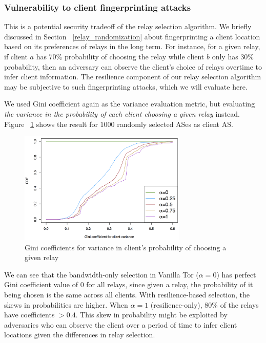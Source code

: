 \subsubsection{Vulnerability to client fingerprinting attacks}
This is a potential security tradeoff of the relay selection algorithm. We briefly discussed in Section ~\ref{relay_randomization} about fingerprinting a client location based on its preferences of relays in the long term. For instance, for a given relay, if client $a$ has 70\% probability of choosing the relay while client $b$ only has 30\% probability, then an adversary can observe the client's choice of relays overtime to infer client information. The resilience component of our relay selection algorithm may be subjective to such fingerprinting attacks, which we will evaluate here. 

We used Gini coefficient again as the variance evaluation metric, but evaluating \emph{the variance in the probability of each client choosing a given relay} instead. Figure ~\ref{fig_gini_client} shows the result for $1000$ randomly selected ASes as client AS. 

\begin{figure}[ht!]
\centering
\includegraphics[width=80mm]{figure/gini_client_variance}
\caption{Gini coefficients for variance in client's probability of choosing a given relay \label{fig_gini_client}}
\end{figure}

We can see that the bandwidth-only selection in Vanilla Tor ($\alpha = 0$) has perfect Gini coefficient value of 0 for all relays, since given a relay, the probability of it being chosen is the same across all clients. With resilience-based selection, the skews in probabilities are higher. When $\alpha = 1$ (resilience-only), $80\%$ of the relays have coefficients $> 0.4$. This skew in probability might be exploited by adversaries who can observe the client over a period of time to infer client locations given the differences in relay selection.

